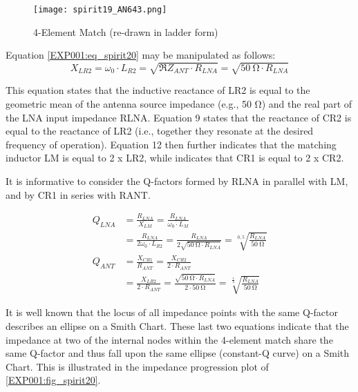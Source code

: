         \begin{figure}[ht!] %
          \centering
          \texttt{[image: spirit19\_AN643.png]}
          \caption{4-Element Match (re-drawn in ladder form) \cite[s.~17]{AN643SiliconLabs}}
          \label{EXP001:fig_spirit19}
        \end{figure}
        
        Equation \ref{EXP001:eq_spirit20} may be manipulated as follows:
        \begin{equation}\label{EXP001:eq_spirit26}
          X_{LR2} = \omega_0\cdot L_{R2} 
                  = \sqrt{\Re{Z_{ANT}\cdot R_{LNA}}} 
                  = \sqrt{\SI{50}{\ohm}\cdot R_{LNA}}
        \end{equation}
        
        This equation states that the inductive reactance of LR2 is equal to the geometric mean of 
        the antenna source impedance (e.g., 50 Ω) and the real part of the LNA input impedance 
        RLNA. Equation 9 states that the reactance of CR2 is equal to the reactance of LR2 (i.e., 
        together they resonate at the desired frequency of operation). Equation 12 then further 
        indicates that the matching inductor LM is equal to 2 x LR2, while indicates that CR1 is 
        equal to 2 x CR2.
        
        It is informative to consider the Q-factors formed by RLNA in parallel with LM, and by CR1 
        in series with RANT.
        
        \begin{align}
          Q_{LNA} &= \frac{R_{LNA}}{X_{LM}} 
                   = \frac{R_{LNA}}{\omega_0\cdot L_{M}}    \nonumber \\
                  &= \frac{R_{LNA}}{2\omega_0\cdot L_{R2}} 
                   = \frac{R_{LNA}}{2\sqrt{\SI{50}{\ohm}\cdot R_{LNA}}}
                   = \sqrt[0,5]{\frac{R_{LNA}}{\SI{50}{\ohm}}}        \label{EXP001:eq_spirit27} \\ 
          Q_{ANT} &= \frac{X_{CR1}}{R_{ANT}} 
                   = \frac{X_{CR2}}{2\cdot R_{ANT}}         \nonumber \\
                  &= \frac{X_{LR2}}{2\cdot R_{ANT}} 
                   = \frac{\sqrt{\SI{50}{\ohm}\cdot R_{LNA}}}{2\cdot \SI{50}{\ohm}}
                   = \sqrt[\frac{1}{2}]{\frac{R_{LNA}}{\SI{50}{\ohm}}}  \label{EXP001:eq_spirit28}  
        \end{align}
        
        It is well known that the locus of all impedance points with the same Q-factor describes an 
        ellipse on a Smith Chart. These last two equations indicate that the impedance at two of 
        the internal nodes within the 4-element match share the same Q-factor and thus fall upon 
        the same ellipse (constant-Q curve) on a Smith Chart. This is illustrated in the impedance 
        progression plot of 
        \ref{EXP001:fig_spirit20}.
        
